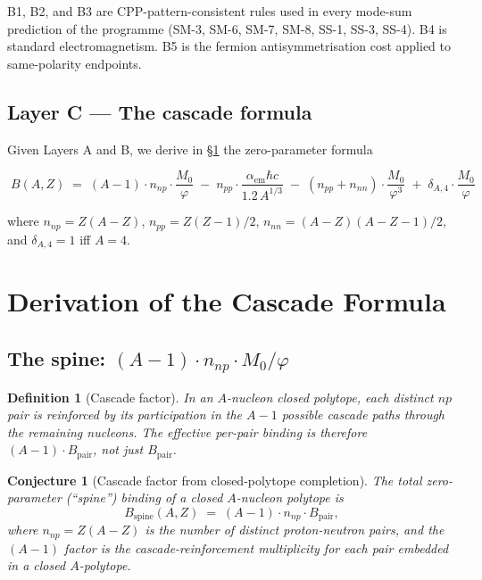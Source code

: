 \documentclass[11pt,letterpaper]{article}
\newtheorem{conjecture}[theorem]{Conjecture}
\newtheorem{definition}[theorem]{Definition}
\newcommand{\phig}{\varphi}
\newcommand{\Mzero}{M_0}
\newcommand{\Bpair}{B_{\mathrm{pair}}}
\newcommand{\npnp}{n_{np}}
\newcommand{\npp}{n_{pp}}
\newcommand{\nnn}{n_{nn}}
\begin{document}
B1, B2, and B3 are CPP-pattern-consistent rules used in every mode-sum prediction of the programme (SM-3, SM-6, SM-7, SM-8, SS-1, SS-3, SS-4). B4 is standard electromagnetism. B5 is the fermion antisymmetrisation cost applied to same-polarity endpoints.

\subsection{Layer C --- The cascade formula}
\label{sec:layerC}

Given Layers A and B, we derive in \S\ref{sec:cascade_formula} the zero-parameter formula

\begin{equation}
\boxed{\;B(A,Z) \;=\; (A-1)\cdot \npnp\cdot \frac{\Mzero}{\phig} \;-\; \npp\cdot \frac{\alpha_{\mathrm{em}}\hbar c}{1.2\, A^{1/3}} \;-\; (\npp + \nnn)\cdot \frac{\Mzero}{\phig^{3}} \;+\; \delta_{A,4}\cdot \frac{\Mzero}{\phig}\;}
\label{eq:cascade_main}
\end{equation}

where $\npnp = Z(A-Z)$, $\npp = Z(Z-1)/2$, $\nnn = (A-Z)(A-Z-1)/2$, and $\delta_{A,4} = 1$ iff $A=4$.

\section{Derivation of the Cascade Formula}
\label{sec:cascade_formula}

\subsection{The spine: $(A-1) \cdot \npnp \cdot \Mzero/\phig$}
\label{sec:spine}

\begin{definition}[Cascade factor]
\label{def:cascade}
In an $A$-nucleon closed polytope, each distinct $np$ pair is reinforced by its participation in the $A-1$ possible cascade paths through the remaining nucleons. The effective per-pair binding is therefore $(A-1) \cdot \Bpair$, not just $\Bpair$.
\end{definition}

\begin{conjecture}[Cascade factor from closed-polytope completion]
\label{conj:cascade}
The total zero-parameter (``spine'') binding of a closed $A$-nucleon polytope is
\begin{equation}
B_{\mathrm{spine}}(A, Z) \;=\; (A-1) \cdot \npnp \cdot \Bpair,
\label{eq:spine}
\end{equation}
where $\npnp = Z(A-Z)$ is the number of distinct proton-neutron pairs, and the $(A-1)$ factor is the cascade-reinforcement multiplicity for each pair embedded in a closed $A$-polytope.
\end{conjecture}
\end{document}
